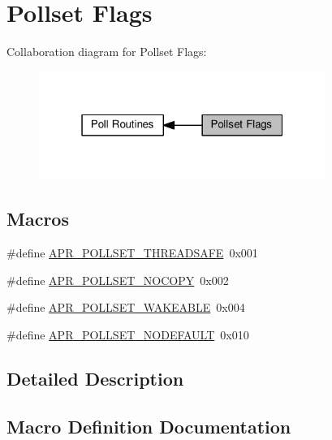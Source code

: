 \hypertarget{group__pollflags}{}\section{Pollset Flags}
\label{group__pollflags}
Collaboration diagram for Pollset Flags\+:
\nopagebreak
\begin{figure}[H]
\begin{center}
\leavevmode
\includegraphics[width=265pt]{group__pollflags}
\end{center}
\end{figure}
\subsection*{Macros}
\begin{DoxyCompactItemize}
\item 
\#define \hyperlink{group__pollflags_gabdfaccfd394c847f692351dee2e5ef7f}{A\+P\+R\+\_\+\+P\+O\+L\+L\+S\+E\+T\+\_\+\+T\+H\+R\+E\+A\+D\+S\+A\+FE}~0x001
\item 
\#define \hyperlink{group__pollflags_ga0febaf4378d2705bf1256b22fe8dfd24}{A\+P\+R\+\_\+\+P\+O\+L\+L\+S\+E\+T\+\_\+\+N\+O\+C\+O\+PY}~0x002
\item 
\#define \hyperlink{group__pollflags_ga552d7f28d442602e6c9bb6931f183493}{A\+P\+R\+\_\+\+P\+O\+L\+L\+S\+E\+T\+\_\+\+W\+A\+K\+E\+A\+B\+LE}~0x004
\item 
\#define \hyperlink{group__pollflags_gaa46a9cbb23b2e8e71dd3ba88e69fdf13}{A\+P\+R\+\_\+\+P\+O\+L\+L\+S\+E\+T\+\_\+\+N\+O\+D\+E\+F\+A\+U\+LT}~0x010
\end{DoxyCompactItemize}


\subsection{Detailed Description}


\subsection{Macro Definition Documentation}

